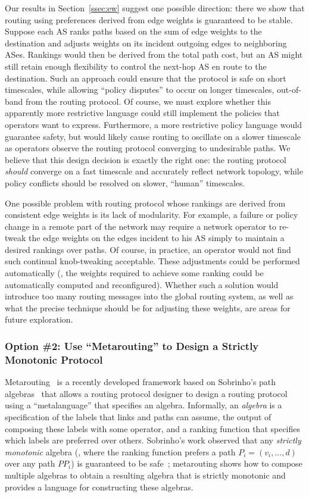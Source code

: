 Our results in
Section~\ref{ssec:ew} suggest one possible direction: there we show that
routing using preferences derived from edge weights is guaranteed to be
stable.  Suppose each AS ranks paths based on the sum of edge weights to
the destination and adjusts weights on its incident outgoing edges to
neighboring ASes.  Rankings would then be derived from the total path
cost, but an AS might still retain enough flexibility to control the
next-hop AS en route to the destination. Such an approach could ensure
that the protocol is safe on short timescales, while allowing ``policy
disputes'' to occur on longer timescales, out-of-band from the routing
protocol.  Of course, we must explore whether this apparently more
restrictive language could still implement the policies that operators
want to express.  Furthermore, a more restrictive policy language would
guarantee safety, but would likely cause routing to oscillate on a
slower timescale as operators observe the routing protocol converging to
undesirable paths.  We believe that this design decision is
exactly the right one: the routing protocol {\em should} converge on a
fast timescale and accurately reflect network topology, while policy
conflicts should be resolved on slower, ``human'' timescales.

One possible problem with routing protocol whose rankings are derived
from consistent edge weights is its lack of modularity. For example, a
failure or policy change in a remote part of the network may require a
network operator to re-tweak the edge weights on the edges incident to
his AS simply to maintain a desired rankings over paths.  Of course, in
practice, an operator would not find such continual knob-tweaking
acceptable.  These adjustments could be performed automatically (\ie,
the weights required to achieve some ranking could be automatically
computed and reconfigured).  Whether such a solution would introduce too
many routing messages into the global routing system, as well as what the
precise technique should be for adjusting these weights, are areas for
future exploration.

\subsubsection{Option \#2: Use ``Metarouting'' to Design a Strictly
  Monotonic Protocol} 

Metarouting~\cite{Griffin2005} is a recently developed framework based
on Sobrinho's path algebras~\cite{Sobrinho2003} that allows a routing
protocol designer to design a routing protocol using a ``metalanguage''
that specifies an algebra.  Informally, an {\em algebra} is a
specification of the labels that links and paths can assume, the output
of composing these labels with some operator, and a ranking function
that specifies which labels are preferred over others.  Sobrinho's work
observed that any {\em strictly monotonic} algebra (\ie, where the
ranking function prefers a path $P_i = (v_i, \ldots, d)$ over any path
$P P_i$) is guaranteed to be safe~\cite{Sobrinho2003}; metarouting shows
how to compose multiple algebras to obtain a resulting algebra that is
strictly monotonic and provides a language for constructing these
algebras. 

